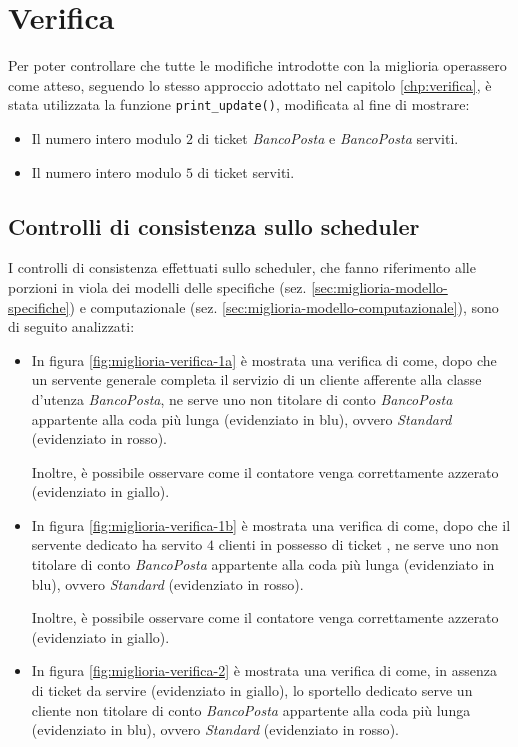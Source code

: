 \section{Verifica}\label{sec:miglioria-verifica}
Per poter controllare che tutte le modifiche introdotte con la miglioria operassero come atteso, seguendo lo stesso approccio adottato nel capitolo \ref{chp:verifica}, è stata utilizzata la funzione \texttt{print\_update()}, modificata al fine di mostrare:
\begin{itemize}
\item Il numero intero modulo $2$ di ticket \uo{}	\textsl{BancoPosta} e \pp{} \textsl{BancoPosta} serviti.
\item Il numero intero modulo $5$ di ticket \sr{} serviti.
\end{itemize}

\subsection{Controlli di consistenza sullo scheduler}
I controlli di consistenza effettuati sullo scheduler, che fanno riferimento alle porzioni in {\color{purple} viola} dei modelli delle specifiche (sez. \ref{sec:miglioria-modello-specifiche}) e computazionale (sez. \ref{sec:miglioria-modello-computazionale}), sono di seguito analizzati:
\begin{itemize}
\item In figura \ref{fig:miglioria-verifica-1a} è mostrata una verifica di come, dopo che un servente generale completa il servizio di un cliente afferente alla classe d'utenza \uo{} \textsl{BancoPosta}, ne serve uno non titolare di conto \textsl{BancoPosta} appartente alla coda più lunga (evidenziato in {\color{verify_blue}blu}), ovvero \uo{} \textsl{Standard} (evidenziato in {\color{verify_red}rosso}). 

Inoltre, è possibile osservare come il contatore venga correttamente azzerato (evidenziato in {\color{verify_yellow}giallo}).
\item In figura \ref{fig:miglioria-verifica-1b} è mostrata una verifica di come, dopo che il servente dedicato ha servito $4$ clienti in possesso di ticket \sr{}, ne serve uno non titolare di conto \textsl{BancoPosta} appartente alla coda più lunga (evidenziato in {\color{verify_blue}blu}), ovvero \pp{} \textsl{Standard} (evidenziato in {\color{verify_red}rosso}). 

Inoltre, è possibile osservare come il contatore venga correttamente azzerato (evidenziato in {\color{verify_yellow}giallo}).
\item In figura \ref{fig:miglioria-verifica-2} è mostrata una verifica di come, in assenza di ticket \sr{} da servire (evidenziato in {\color{verify_yellow}giallo}), lo sportello dedicato serve un cliente non titolare di conto \textsl{BancoPosta} appartente alla coda più lunga (evidenziato in {\color{verify_blue}blu}), ovvero \uo{} \textsl{Standard} (evidenziato in {\color{verify_red}rosso}).
\end{itemize}

